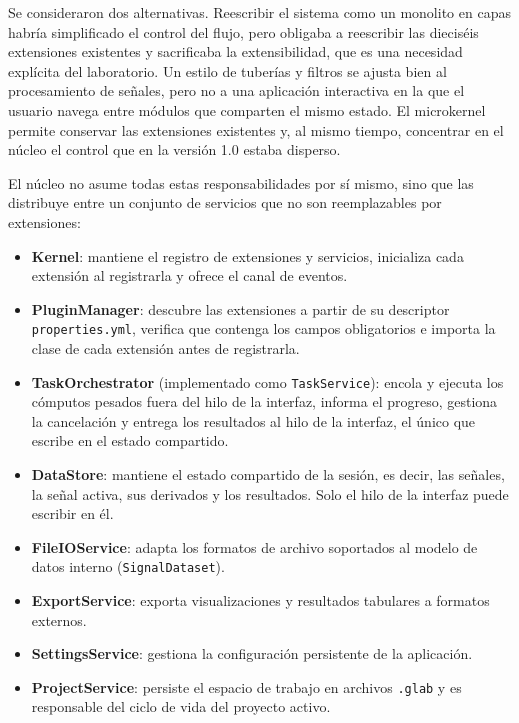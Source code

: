 \documentclass[11pt,a4paper]{article}
\DeclareRobustCommand{\_}{\textunderscore\allowbreak}
\begin{document}
Se consideraron dos alternativas. Reescribir el sistema como un monolito en capas habría simplificado el control del flujo, pero obligaba a reescribir las dieciséis extensiones existentes y sacrificaba la extensibilidad, que es una necesidad explícita del laboratorio. Un estilo de tuberías y filtros se ajusta bien al procesamiento de señales, pero no a una aplicación interactiva en la que el usuario navega entre módulos que comparten el mismo estado. El microkernel permite conservar las extensiones existentes y, al mismo tiempo, concentrar en el núcleo el control que en la versión 1.0 estaba disperso.

El núcleo no asume todas estas responsabilidades por sí mismo, sino que las distribuye entre un conjunto de servicios que no son reemplazables por extensiones:

\begin{itemize}
    \item \textbf{Kernel}: mantiene el registro de extensiones y servicios, inicializa cada extensión al registrarla y ofrece el canal de eventos.
    \item \textbf{PluginManager}: descubre las extensiones a partir de su descriptor \texttt{properties.yml}, verifica que contenga los campos obligatorios e importa la clase de cada extensión antes de registrarla.
    \item \textbf{TaskOrchestrator} (implementado como \texttt{TaskService}): encola y ejecuta los cómputos pesados fuera del hilo de la interfaz, informa el progreso, gestiona la cancelación y entrega los resultados al hilo de la interfaz, el único que escribe en el estado compartido.
    \item \textbf{DataStore}: mantiene el estado compartido de la sesión, es decir, las señales, la señal activa, sus derivados y los resultados. Solo el hilo de la interfaz puede escribir en él.
    \item \textbf{FileIOService}: adapta los formatos de archivo soportados al modelo de datos interno (\texttt{SignalDataset}).
    \item \textbf{ExportService}: exporta visualizaciones y resultados tabulares a formatos externos.
    \item \textbf{SettingsService}: gestiona la configuración persistente de la aplicación.
    \item \textbf{ProjectService}: persiste el espacio de trabajo en archivos \texttt{.glab} y es responsable del ciclo de vida del proyecto activo.
\end{itemize}
\end{document}
